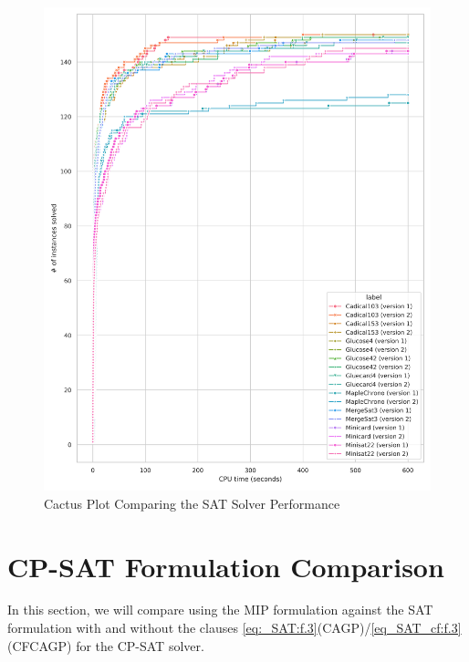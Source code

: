 \begin{figure}[htbp]
\centering
\includegraphics[scale=0.7]{Thesis/figures/minibenchmark_cactus_plot_runtime_SAT_with_holes.png}
\caption{Cactus Plot Comparing the SAT Solver Performance}
\label{fig:cactus_SAT}
\end{figure}


\section{CP-SAT Formulation Comparison}
In this section, we will compare using the MIP formulation against the SAT formulation with and without the clauses \cref{eq:_SAT:f.3}(CAGP)/\cref{eq_SAT_cf:f.3}(CFCAGP) for the CP-SAT solver. 

